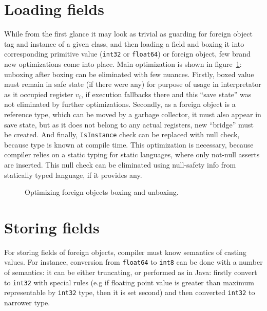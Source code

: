 \documentclass[times, %
               specification,annotation, %
               titlepage-extra-ru,specification-extra-ru,annotation-extra-ru, %
               languages={russian,english} %
              ]{itmo-student-thesis}
\begin{document}
\section{Loading fields}
While from the first glance it may look as trivial as guarding for foreign object tag and instance of a given class, and then loading a field and boxing it into corresponding primitive value (\texttt{int32} or \texttt{float64}) or foreign object, few brand new optimizations come into place. Main optimization is shown in figure~\ref{fig:field-opt}: unboxing after boxing can be eliminated with few nuances. Firstly, boxed value must remain in safe state (if there were any) for purpose of usage in interpretator as it occupied register $v_i$, if execution fallbacks there and this ``save state'' was not eliminated by further optimizations. Secondly, as a foreign object is a reference type, which can be moved by a garbage collector, it must also appear in save state, but as it does not belong to any actual registers, new ``bridge'' must be created. And finally, \texttt{IsInstance} check can be replaced with null check, because type is known at compile time. This optimization is necessary, because compiler relies on a static typing for static languages, where only not-null asserts are inserted. This null check can be eliminated using null-safety info from statically typed language, if it provides any.
\begin{figure}[H]
    \caption{Optimizing foreign objects boxing and unboxing.}\label{fig:field-opt}
    \centering
    \end{figure}

\section{Storing fields}
For storing fields of foreign objects, compiler must know semantics of casting values. For instance, conversion from \texttt{float64} to \texttt{int8} can be done with a number of semantics: it can be either truncating, or performed as in Java: firstly convert to \texttt{int32} with special rules (e.g if floating point value is greater than maximum representable by \texttt{int32} type, then it is set second) and then converted \texttt{int32} to narrower type.
\end{document}
